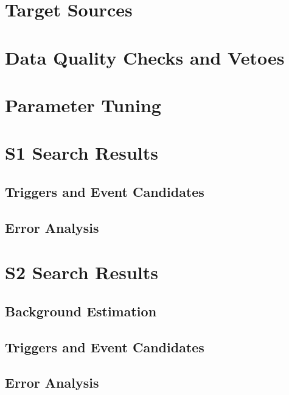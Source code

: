 
\section{Target Sources}

\section{Data Quality Checks and Vetoes}

\section{Parameter Tuning}

\section{S1 Search Results}

\subsection{Triggers and Event Candidates}

\subsection{Error Analysis}

\section{S2 Search Results}

\subsection{Background Estimation}

\subsection{Triggers and Event Candidates}

\subsection{Error Analysis}

